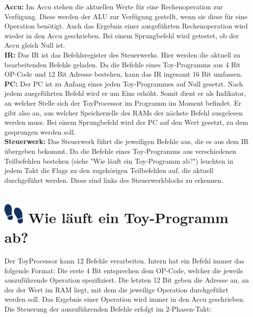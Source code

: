 \documentclass{article}
\begin{document}
\noindent \textbf{Accu:}
Im Accu stehen die aktuellen Werte für eine Rechenoperation zur Verfügung. Diese
werden der ALU zur Verfügung gestellt, wenn sie diese für eine Operation benötigt.
Auch das Ergebnis einer ausgeführten Rechenoperation wird wieder in den Accu geschrieben.
Bei einem Sprungbefehl wird getestet, ob der Accu gleich Null ist.\\

\noindent \textbf{IR:}
Das IR ist das Befehlsregister des Steuerwerks. Hier werden die aktuell zu bearbeitenden
Befehle geladen. Da die Befehle eines Toy-Programms aus 4 Bit OP-Code und 12 Bit Adresse bestehen, kann das
IR ingesamt 16 Bit umfassen.\\

\noindent \textbf{PC:}
Der PC ist zu Anfang eines jeden Toy-Programmes auf Null gesetzt. Nach jedem ausgeführten
Befehl wird er um Eins erhöht. Somit dient er als Indikator, an welcher Stelle sich der
ToyProcessor im Programm im Moment befindet. Er gibt also an, aus welcher Speicherzelle des
RAMs der nächste Befehl ausgelesen werden muss. Bei einem Sprungbefehl wird der PC auf
den Wert gesetzt, zu dem gesprungen werden soll.\\

\noindent \textbf{Steuerwerk:}
Das Steuerwerk führt die jeweiligen Befehle aus, die es aus dem IR übergeben bekommt.
Da die Befehle eines Toy-Programms aus verschiedenen Teilbefehlen bestehen (siehe "Wie
läuft ein Toy-Programm ab?") leuchten in jedem Takt die Flags zu den zugehörigen Teilbefehlen
auf, die aktuell durchgeführt werden. Diese sind links des Steuerwerkblocks zu erkennen. \\

\newpage

\section*{\includegraphics[width=1cm]{./icon_ablauf.png}
\hspace{0.25cm} Wie läuft ein Toy-Programm ab?}
Der ToyProcessor kann 12 Befehle verarbeiten. Intern hat ein Befehl immer das folgende Format: Die erste 4 Bit entsprechen
dem OP-Code, welcher die jeweils auszuführende Operation spezifiziert. Die
letzten 12 Bit geben die Adresse an, an der der Wert im RAM liegt, mit dem
die jeweilige Operation durchgeführt werden soll. Das Ergebnis einer Operation
wird immer in den Accu geschrieben. Die Steuerung der auszuführenden
Befehle erfolgt im 2-Phasen-Takt:
\end{document}
